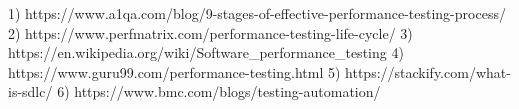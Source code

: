 1) https://www.a1qa.com/blog/9-stages-of-effective-performance-testing-process/
2) https://www.perfmatrix.com/performance-testing-life-cycle/
3) https://en.wikipedia.org/wiki/Software_performance_testing
4) https://www.guru99.com/performance-testing.html
5) https://stackify.com/what-is-sdlc/
6) https://www.bmc.com/blogs/testing-automation/
